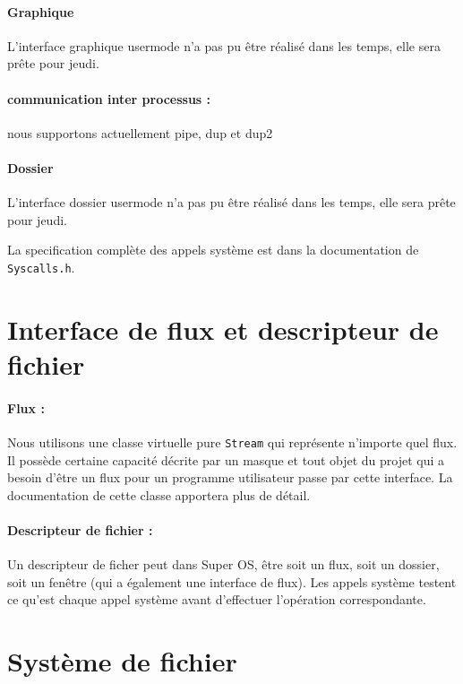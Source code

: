 \documentclass[12pt]{report}
\begin{document}
\paragraph{Graphique} L'interface graphique usermode n'a pas pu être réalisé
dans les temps, elle sera prête pour jeudi.

\paragraph{communication inter processus :} nous supportons actuellement pipe,
dup et dup2 

\paragraph{Dossier} L'interface dossier usermode n'a pas pu être réalisé
dans les temps, elle sera prête pour jeudi.


La specification complète des appels système est dans la documentation de \verb$Syscalls.h$.

\section{Interface de flux et descripteur de fichier}

\paragraph{Flux :} Nous utilisons une classe virtuelle pure \verb$Stream$ qui représente n'importe
quel flux. Il possède certaine capacité décrite par un masque et tout objet du
projet qui a besoin d'être un flux pour un programme utilisateur passe par cette
interface. La documentation de cette classe apportera plus de détail.

\paragraph{Descripteur de fichier :} Un descripteur de ficher peut dans Super
OS, être soit un flux, soit un dossier, soit un fenêtre (qui a également une
interface de flux). Les appels système testent ce qu'est chaque appel système
avant d'effectuer l'opération correspondante.




\section{Système de fichier}
\end{document}
